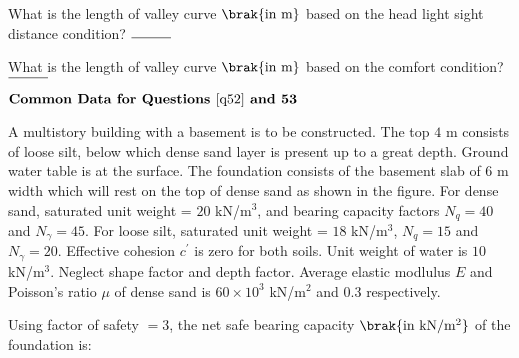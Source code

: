     \item \label{q50} What is the length of valley curve $\brak{\text{in m}}$ based on the head light sight distance condition? $\rule{1cm}{0.15mm}$
	\hfill{}

    \item \label{q51}What is the length of valley curve $\brak{\text{in m}}$ based on the comfort condition? $\rule{1cm}{0.15mm}$
	\hfill{}

	$\textbf{Common Data for Questions } \ref{q52} \textbf{ and 53}$
	\newline

	A multistory building with a basement is to be constructed. The top $4$ m consists of loose silt, below which dense sand layer is present up to a great depth. Ground water table is at the surface. The foundation consists of the basement slab of $6$ m width which will rest on the top of dense sand as shown in the figure. For dense sand, saturated unit weight = $20$ kN/$\text{m}^3$, and bearing capacity factors $N_q = 40$ and $N_{\gamma} = 45$. For loose silt, saturated unit weight = $18$ kN/$\text{m}^3$, $N_q = 15$ and $N_{\gamma} = 20$. Effective cohesion $c^{\prime}$ is zero for both soils. Unit weight of water is $10$ kN/$\text{m}^3$. Neglect shape factor and depth factor. 
	\newline
	Average elastic modlulus $E$ and Poisson's ratio $\mu$ of dense sand is $60 \times 10^3$ kN/$\text{m}^2$ and $0.3$ respectively.

    \item \label{q52} Using factor of safety $= 3$, the net safe bearing capacity $\brak{\text{in kN/} \text{m}^2}$ of the foundation is:

